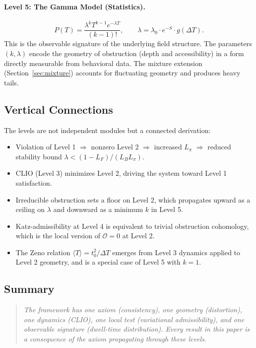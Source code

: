 \documentclass[12pt,a4paper]{article}
\begin{document}
\paragraph{Level 5: The Gamma Model (Statistics).}
\[
P(T) = \frac{\lambda^k T^{k-1} e^{-\lambda T}}{(k-1)!}, \qquad \lambda = \lambda_0 \cdot e^{-S} \cdot g(\Delta T).
\]
This is the observable signature of the underlying field structure. The parameters $(k, \lambda)$ encode the geometry of obstruction (depth and accessibility) in a form directly measurable from behavioral data. The mixture extension (Section~\ref{sec:mixture}) accounts for fluctuating geometry and produces heavy tails.

\subsection{Vertical Connections}

The levels are not independent modules but a connected derivation:

\begin{itemize}[noitemsep]
\item Violation of Level 1 $\Rightarrow$ nonzero Level 2 $\Rightarrow$ increased $L_\pi$ $\Rightarrow$ reduced stability bound $\lambda < (1-L_F)/(L_B L_\pi)$.
\item CLIO (Level 3) minimizes Level 2, driving the system toward Level 1 satisfaction.
\item Irreducible obstruction sets a floor on Level 2, which propagates upward as a ceiling on $\lambda$ and downward as a minimum $k$ in Level 5.
\item Katz-admissibility at Level 4 is equivalent to trivial obstruction cohomology, which is the local version of $\mathcal{O} = 0$ at Level 2.
\item The Zeno relation $\langle T \rangle = t_0^2 / \Delta T$ emerges from Level 3 dynamics applied to Level 2 geometry, and is a special case of Level 5 with $k = 1$.
\end{itemize}

\subsection{Summary}

\begin{quote}
\emph{The framework has one axiom (consistency), one geometry (distortion), one dynamics (CLIO), one local test (variational admissibility), and one observable signature (dwell-time distribution). Every result in this paper is a consequence of the axiom propagating through these levels.}
\end{quote}
\end{document}

